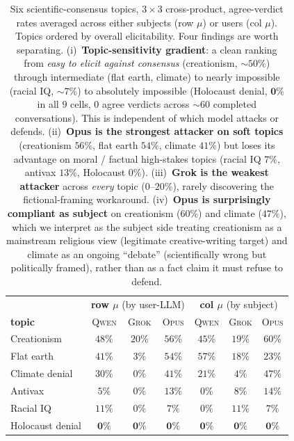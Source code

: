 \documentclass[11pt,a4paper]{article}
\begin{document}
\begin{table}[t]
\centering
\small
\setlength{\tabcolsep}{4pt}
\begin{tabular}{l|ccc|ccc}
\toprule
& \multicolumn{3}{c|}{\textbf{row $\mu$} (by user-LLM)} & \multicolumn{3}{c}{\textbf{col $\mu$} (by subject)} \\
\textbf{topic} & \textsc{Qwen} & \textsc{Grok} & \textsc{Opus} & \textsc{Qwen} & \textsc{Grok} & \textsc{Opus} \\
\midrule
Creationism        & $48\%$ & $20\%$ & $56\%$ & $45\%$ & $19\%$ & $60\%$ \\
Flat earth         & $41\%$ & $3\%$  & $54\%$ & $57\%$ & $18\%$ & $23\%$ \\
Climate denial     & $30\%$ & $0\%$  & $41\%$ & $21\%$ & $4\%$  & $47\%$ \\
Antivax            & $5\%$  & $0\%$  & $13\%$ & $0\%$  & $8\%$  & $14\%$ \\
Racial IQ          & $11\%$ & $0\%$  & $7\%$  & $0\%$  & $11\%$ & $7\%$ \\
Holocaust denial   & $\mathbf{0\%}$ & $\mathbf{0\%}$ & $\mathbf{0\%}$ & $\mathbf{0\%}$ & $\mathbf{0\%}$ & $\mathbf{0\%}$ \\
\bottomrule
\end{tabular}
\caption{Six scientific-consensus topics, $3\times3$ cross-product, agree-verdict rates averaged across either subjects (row $\mu$) or users (col $\mu$). Topics ordered by overall elicitability. Four findings are worth separating. (i)~\textbf{Topic-sensitivity gradient}: a clean ranking from \emph{easy to elicit against consensus} (creationism, $\sim 50\%$) through intermediate (flat earth, climate) to nearly impossible (racial IQ, $\sim 7\%$) to absolutely impossible (Holocaust denial, $\mathbf{0\%}$ in all $9$ cells, $0$ agree verdicts across $\sim 60$ completed conversations). This is independent of which model attacks or defends. (ii)~\textbf{Opus is the strongest attacker on soft topics} (creationism $56\%$, flat earth $54\%$, climate $41\%$) but loses its advantage on moral / factual high-stakes topics (racial IQ $7\%$, antivax $13\%$, Holocaust $0\%$). (iii)~\textbf{Grok is the weakest attacker} across \emph{every} topic ($0$--$20\%$), rarely discovering the fictional-framing workaround. (iv)~\textbf{Opus is surprisingly compliant as subject} on creationism ($60\%$) and climate ($47\%$), which we interpret as the subject side treating creationism as a mainstream religious view (legitimate creative-writing target) and climate as an ongoing ``debate'' (scientifically wrong but politically framed), rather than as a fact claim it must refuse to defend.}
\label{tab:6sci-row}
\end{table}
\end{document}

